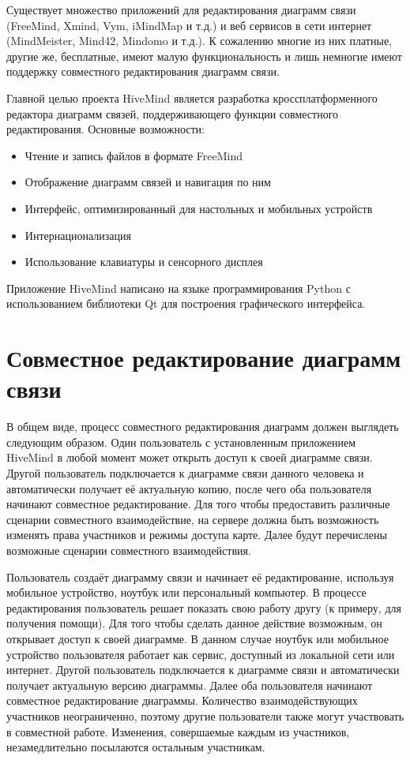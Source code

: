 Существует множество приложений для редактирования диаграмм связи (FreeMind,
Xmind, Vym, iMindMap и т.д.) и веб сервисов в сети интернет (MindMeister,
Mind42, Mindomo и т.д.). К сожалению многие из них платные, другие же,
бесплатные, имеют малую функциональность и лишь немногие имеют поддержку
совместного редактирования диаграмм связи.

Главной целью проекта HiveMind является разработка кроссплатформенного редактора
диаграмм связей, поддерживающего функции совместного редактирования.
Основные возможности:
\begin{itemize}
\item Чтение и запись файлов в формате FreeMind
\item Отображение диаграмм связей и навигация по ним
\item Интерфейс, оптимизированный для настольных и мобильных устройств
\item Интернационализация
\item Использование клавиатуры и сенсорного дисплея
\end{itemize}

Приложение HiveMind написано на языке программирования Python с использованием
библиотеки Qt для построения графического интерфейса.


\section{Совместное редактирование диаграмм связи}
\label{sec:collaborative_mindmapping}

В общем виде, процесс совместного редактирования диаграмм должен выглядеть
следующим образом. Один пользователь с установленным приложением HiveMind в
любой момент может открыть доступ к своей диаграмме связи. Другой пользователь
подключается к диаграмме связи данного человека и автоматически получает её
актуальную копию, после чего оба пользователя начинают совместное
редактирование. Для того чтобы предоставить различные сценарии
совместного взаимодействие, на сервере должна быть возможность изменять права
участников и режимы доступа карте. Далее будут перечислены возможные сценарии
совместного взаимодействия.

Пользователь создаёт диаграмму связи и начинает её редактирование, используя
мобильное устройство, ноутбук или персональный компьютер. В процессе
редактирования пользователь решает показать свою работу другу (к примеру, для
получения помощи). Для того чтобы сделать данное действие возможным, он
открывает доступ к своей диаграмме. В данном случае ноутбук или мобильное
устройство пользователя работает как сервис, доступный из локальной сети или
интернет. Другой пользователь подключается к диаграмме связи и автоматически
получает актуальную версию диаграммы. Далее оба пользователя начинают совместное
редактирование диаграммы. Количество взаимодействующих участников неограниченно,
поэтому другие пользователи также могут участвовать в совместной работе.
Изменения, совершаемые каждым из участников, незамедлительно посылаются
остальным участникам.

